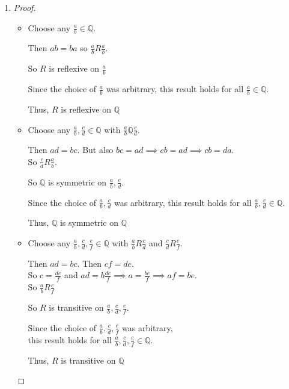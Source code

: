 \documentclass[12pt,letterpaper]{article}
\newcommand*\reflexive[4]{%
  Choose any $#3 \in #1$.

  #4

  So $#2$ is reflexive on $#3$

  Since the choice of $#3$ was arbitrary,
  this result holds for all $#3 \in #1$.

  Thus, $#2$ is reflexive on $#1$
}
\newcommand*\symmetric[5]{%
  Choose any $#3, #4 \in #1$ with $#3 #1 #4$.

  #5

  So $#1$ is symmetric on $#3, #4$.

  Since the choice of $#3, #4$ was arbitrary,
  this result holds for all $#3, #4 \in #1$.

  Thus, $#1$ is symmetric on $#1$
}
\newcommand*\transitive[6]{%
  Choose any $#3, #4, #5 \in #1$ with $#3 #2 #4$ and $#4 #2 #5$.

  #6

  So $#2$ is transitive on $#3, #4, #5$.

  Since the choice of $#3, #4, #5$ was arbitrary, \\
  this result holds for all $#3, #4, #5 \in #1$.

  Thus, $#2$ is transitive on $#1$
}
\newcommand*\equivrel[8]{%
  \begin{itemize}
    \item \reflexive{#1}{#2}{#3}{#6}
    \item \symmetric{#1}{#2}{#3}{#4}{#7}
    \item \transitive{#1}{#2}{#3}{#4}{#5}{#8}
  \end{itemize}
}
\begin{document}
\begin{enumerate}
\begin{enumerate}
\begin{enumerate}
            \setcounter{enumiii}{7}
            \item
              \begin{proof}
                Call the set of all differentiable functions $D$.
                \equivrel{D}{R}{f}{g}{h}{
                  Then $f$ has the same first derivative as $f$. \\
                  So $f R f$.
                }{
                  Then $f$ has the same first derivative as $g$.
                  This means that $g$ has the same first derivative as $f$. \\
                  So $g R f$.
                }{
                  Then $f$ has the same first derivative as $g$.
                  Call this derivative $p$.
                  Then $g$ has the same first derivative as $h$.
                  Call this derivative $q$. \\
                  Then $f' = g' = p = q = g' = h'$. \\
                  So $f' = h'$ and $f R h$.
                }
              \end{proof}

              Three elements in $x^2 / R$ are: $x^2, x^2 + 1, x^2 + 2$.

              Three elements in $(4x^2 + 10x) / R$ are: $4x^2 + 10x, 4x^2 + 10x + 1, 4x^2 + 10x + 2$.

              $x^3 / R$ is the set of all functions whose first derivative is $3x^2$.

              $7 / R$ is the set of all functions whose first derivative is $0$.
          \end{enumerate}
        \item
          \begin{proof}
            \equivrel{\mathbb{Q}}{R}{\frac{a}{b}}{\frac{c}{d}}{\frac{e}{f}}{
              Then $ab = ba$ so $\frac{a}{b} R \frac{a}{b}$.
            }{
              Then $ad = bc$.
              But also $bc = ad \implies cb = ad \implies cb = da$. \\
              So $\frac{c}{d} R \frac{a}{b}$.
            }{
              Then $ad = bc$.
              Then $cf = de$. \\
              So $c = \frac{de}{f}$ and $ad = b\frac{de}{f} \implies a = \frac{be}{f} \implies af = be$. \\
              So $\frac{a}{b} R \frac{e}{f}$
            }
          \end{proof}


\end{enumerate}
\end{enumerate}
\end{document}
